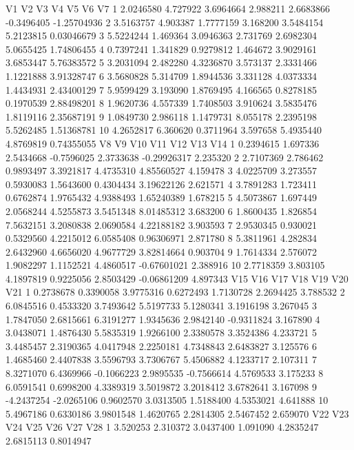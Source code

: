 \documentclass[12pt]{article}
\begin{document}
\begin{Schunk}
\begin{Soutput}
          V1       V2        V3       V4        V5         V6          V7
1  2.0246580 4.727922 3.6964664 2.988211 2.6683866 -0.3496405 -1.25704936
2  3.5163757 4.903387 1.7777159 3.168200 3.5484154  5.2123815  0.03046679
3  5.5224244 1.469364 3.0946363 2.731769 2.6982304  5.0655425  1.74806455
4  0.7397241 1.341829 0.9279812 1.464672 3.9029161  3.6853447  5.76383572
5  3.2031094 2.482280 4.3236870 3.573137 2.3331466  1.1221888  3.91328747
6  3.5680828 5.314709 1.8944536 3.331128 4.0373334  1.4434931  2.43400129
7  5.9599429 3.193090 1.8769495 4.166565 0.8278185  0.1970539  2.88498201
8  1.9620736 4.557339 1.7408503 3.910624 3.5835476  1.8119116  2.35687191
9  1.0849730 2.986118 1.1479731 8.055178 2.2395198  5.5262485  1.51368781
10 4.2652817 6.360620 0.3711964 3.597658 5.4935440  4.8769819  0.74355055
          V8       V9       V10        V11       V12         V13      V14
1  0.2394615 1.697336 2.5434668 -0.7596025 2.3733638 -0.29926317 2.235320
2  2.7107369 2.786462 0.9893497  3.3921817 4.4735310  4.85560527 4.159478
3  4.0225709 3.273557 0.5930083  1.5643600 0.4304434  3.19622126 2.621571
4  3.7891283 1.723411 0.6762874  1.9765432 4.9388493  1.65240389 1.678215
5  4.5073867 1.697449 2.0568244  4.5255873 3.5451348  8.01485312 3.683200
6  1.8600435 1.826854 7.5632151  3.2080838 2.0690584  4.22188182 3.903593
7  2.9530345 0.930021 0.5329560  4.2215012 6.0585408  0.96306971 2.871780
8  5.3811961 4.282834 2.6432960  4.6656020 4.9677729  3.82814664 0.903704
9  1.7614334 2.576072 1.9082297  1.1152521 4.4860517 -0.67601021 2.388916
10 2.7718359 3.803105 4.1897819  0.9225056 2.8503429 -0.06861209 4.897343
          V15        V16        V17       V18        V19        V20      V21
1   0.2738678  0.3390058  3.9775316 0.6272493  1.7130728  2.2694425 3.788532
2   6.0845516  0.4533320  3.7493642 5.5197733  5.1280341  3.1916198 3.267045
3   1.7847050  2.6815661  6.3191277 1.9345636  2.9842140 -0.9311824 3.167890
4   3.0438071  1.4876430  5.5835319 1.9266100  2.3380578  3.3524386 4.233721
5   3.4485457  2.3190365  4.0417948 2.2250181  4.7348843  2.6483827 3.125576
6   1.4685460  2.4407838  3.5596793 3.7306767  5.4506882  4.1233717 2.107311
7   8.3271070  6.4369966 -0.1066223 2.9895535 -0.7566614  4.5769533 3.175233
8   6.0591541  0.6998200  4.3389319 3.5019872  3.2018412  3.6782641 3.167098
9  -4.2437254 -2.0265106  0.9602570 3.0313505  1.5188400  4.5353021 4.641888
10  5.4967186  0.6330186  3.9801548 1.4620765  2.2814305  2.5467452 2.659070
        V22      V23       V24       V25       V26       V27        V28
1  3.520253 2.310372 3.0437400  1.091090 4.2835247 2.6815113  0.8014947

\end{Soutput}
\end{Schunk}
\end{document}

